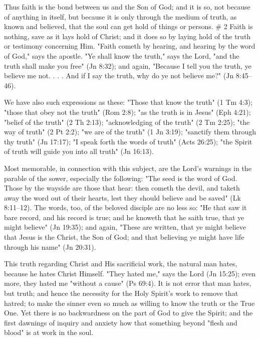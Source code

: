 \documentclass[
]{book}
\begin{document}
Thus faith is the bond between us and the Son of God; and it is so, not because of anything in itself, but because it is only through the medium of truth, as known and believed, that the soul can get hold of things or persons.
\# 2
Faith is nothing, save as it lays hold of Christ; and it does so by laying hold of the truth or testimony concerning Him. "Faith cometh by hearing, and hearing by the word of God," says the apostle. "Ye shall know the truth," says the Lord, "and the truth shall make you free" (Jn 8:32); and again, "Because I tell you the truth, ye believe me not. . . . And if I say the truth, why do ye not believe me?" (Jn 8:45--46).

We have also such expressions as these: "Those that know the truth" (1 Tm 4:3); "those that obey not the truth" (Rom 2:8); "as the truth is in Jesus" (Eph 4:21); "belief of the truth" (2 Th 2:13); "acknowledging of the truth" (2 Tm 2:25); "the way of truth" (2 Pt 2:2); "we are of the truth" (1 Jn 3:19); "sanctify them through thy truth" (Jn 17:17); "I speak forth the words of truth" (Acts 26:25); "the Spirit of truth will guide you into all truth" (Jn 16:13).

Most memorable, in connection with this subject, are the Lord's warnings in the parable of the sower, especially the following: "The seed is the word of God. Those by the wayside are those that hear: then cometh the devil, and taketh away the word out of their hearts, lest they should believe and be saved" (Lk 8:11--12). The words, too, of the beloved disciple are no less so: "He that saw it bare record, and his record is true; and he knoweth that he saith true, that ye might believe" (Jn 19:35); and again, "These are written, that ye might believe that Jesus is the Christ, the Son of God; and that believing ye might have life through his name" (Jn 20:31).

This truth regarding Christ and His sacrificial work, the natural man hates, because he hates Christ Himself. "They hated me," says the Lord (Jn 15:25); even more, they hated me "without a cause" (Ps 69:4). It is not error that man hates, but truth; and hence the necessity for the Holy Spirit's work to remove that hatred; to make the sinner even so much as willing to know the truth or the True One. Yet there is no backwardness on the part of God to give the Spirit; and the first dawnings of inquiry and anxiety how that something beyond "flesh and blood" is at work in the soul.
\end{document}
